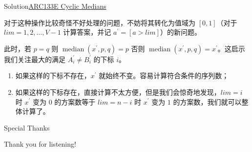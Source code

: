 \documentclass{beamer}
\begin{document}
    \begin{frame}{Solution}{\href{https://atcoder.jp/contests/arc133/tasks/arc133_e}{ARC133E Cyclic Medians}}

        对于这种操作比较奇怪不好处理的问题，不妨将其转化为值域为 $[0,1]$（对于 $lim = 1,2,\dots,V-1$ 计算答案，并记 $a^{\prime} = [a > lim]$）的新问题。
        
        \pause
        
        此时，若 $p = q$ 则 $\operatorname{median}(x^{\prime},p,q) = p$ 否则 $\operatorname{median}(x^{\prime},p,q) = x^{\prime}$。这启示我们关注最大的满足 $A^{\prime}_{i} \neq B^{\prime}_{i}$ 的下标 $i$。

        \pause
        
        \begin{enumerate}
            \item 如果这样的下标不存在，$x^{\prime}$ 就始终不变。容易计算符合条件的序列数；
            
            \pause
            
            \item 如果这样的下标存在，直接计算不太方便，但是我们会惊奇地发现，$lim = i$ 时 $x^{\prime}$ 变为 $0$ 的方案数等于 $lim = n-i$ 时 $x^{\prime}$ 变为 $1$ 的方案数，我们就可以整体计算了。
        \end{enumerate}
    
	\end{frame}
    
	\begin{frame}{Special Thanks}
		
		Thank you for listening!
		
	\end{frame}
\end{document}
